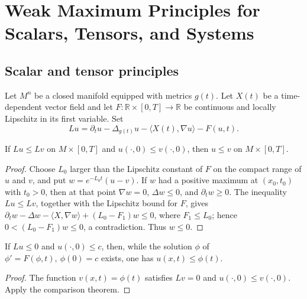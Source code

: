 \chapter[10]{Weak Maximum Principles for Scalars, Tensors, and Systems}
\label{chow-ii-ch10-weak-maximum-principles}

\section{Scalar and tensor principles}

\begin{definition}
\label{def:chow-ii-semilinear-heat-operator}

Let $M^n$ be a closed manifold equipped with metrics $g(t)$.  Let $X(t)$ be a
time-dependent vector field and let $F:\mathbb R\times[0,T]\to\mathbb R$ be
continuous and locally Lipschitz in its first variable.  Set
\[
 Lu=\partial_tu-\Delta_{g(t)}u-\langle X(t),\nabla u\rangle-F(u,t).
\]
\end{definition}

\begin{theorem}
\label{thm:chow-ii-scalar-comparison}


If $Lu\le Lv$ on $M\times[0,T]$ and $u(\cdot,0)\le v(\cdot,0)$, then
\(u\le v\) on $M\times[0,T]$.
\end{theorem}
\begin{proof}
\sketch
{}
Choose $L_0$ larger than the Lipschitz constant of $F$ on the compact range of
$u$ and $v$, and put $w=e^{-L_0t}(u-v)$.  If $w$ had a positive maximum at
$(x_0,t_0)$ with $t_0>0$, then at that point
\(\nabla w=0\), $\Delta w\le0$, and $\partial_tw\ge0$.  The inequality
\(Lu\le Lv\), together with the Lipschitz bound for $F$, gives
\(\partial_tw-\Delta w-\langle X,\nabla w\rangle+(L_0-F_1)w\le0\), where
$F_1\le L_0$; hence $0< (L_0-F_1)w\le0$, a contradiction.  Thus $w\le0$.
\end{proof}

\begin{theorem}
\label{thm:chow-ii-scalar-wmp}


If $Lu\le0$ and $u(\cdot,0)\le c$, then, while the solution $\phi$ of
\(\phi'=F(\phi,t),\ \phi(0)=c\) exists, one has $u(x,t)\le\phi(t)$.
\end{theorem}
\begin{proof}
\sketch
{}
The function $v(x,t)=\phi(t)$ satisfies $Lv=0$ and $u(\cdot,0)\le v(\cdot,0)$.
Apply the comparison theorem.
\end{proof}

